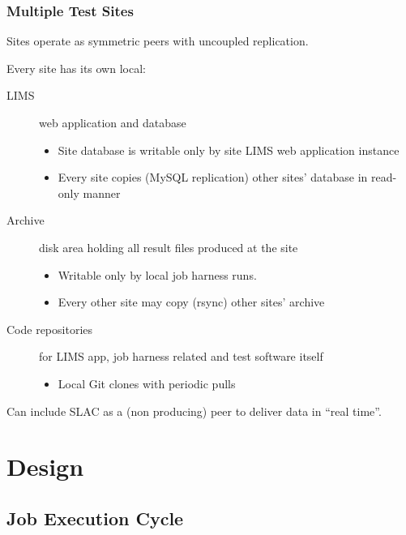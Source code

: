\documentclass[xcolor=dvipsnames]{beamer}
\begin{document}
\begin{frame}
  \frametitle{Multiple Test Sites}
  \begin{center}
    Sites operate as symmetric peers with uncoupled replication.    
  \end{center}


  Every site has its own local:
  \begin{description}
  \item[LIMS] web application and database
    \begin{itemize}
    \item Site database is writable only by site LIMS web application instance
    \item Every site copies (MySQL replication) other sites' database in read-only manner
    \end{itemize}
  \item[Archive] disk area holding all result files produced at the site
    \begin{itemize}
    \item Writable only by local job harness runs.
    \item Every other site may copy (rsync) other sites' archive
    \end{itemize}
  \item[Code repositories] for LIMS app, job harness related and test software itself
    \begin{itemize}
    \item Local Git clones with periodic pulls
    \end{itemize}
  \end{description}

  Can include SLAC as a (non producing) peer to deliver data in ``real time''.
\end{frame}

\section{Design}

\begin{frame}
\end{frame}



\subsection{Job Execution Cycle}
\end{document}
